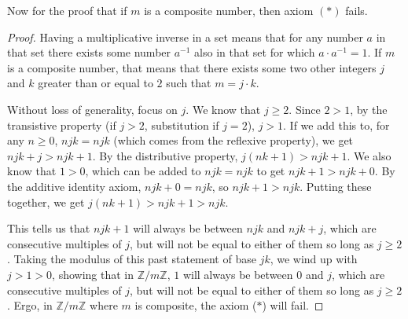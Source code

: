 \documentclass[11pt]{article}
\begin{document}
    Now for the proof that if $m$ is a composite number, then axiom $(\ast)$ fails.
    \begin{proof}
        Having a multiplicative inverse in a set means that for any number $a$ in that set there exists some number $a^{-1}$ also in that set for which $a \cdot a^{-1} = 1$.
        If $m$ is a composite number, that means that there exists some two other integers $j$ and $k$ greater than or equal to $2$ such that $m = j \cdot k$.

        Without loss of generality, focus on $j$.
        We know that $j \ge 2$.
        Since $2 > 1$, by the transistive property (if $j > 2$, substitution if $j = 2$), $j > 1$.
        If we add this to, for any $n \geq 0$, $njk = njk$ (which comes from the reflexive property), we get $njk + j > njk + 1$.
        By the distributive property, $j(nk + 1) > njk + 1$.
        We also know that $1 > 0$, which can be added to $njk = njk$ to get $njk + 1 > njk + 0$.
        By the additive identity axiom, $njk + 0 = njk$, so $njk + 1 > njk$.
        Putting these together, we get $j(nk + 1) > njk + 1 > njk$.

        This tells us that $njk + 1$ will always be between $njk$ and $njk + j$, which are consecutive multiples of $j$, but will not be equal to either of them so long as $j \geq 2$.
        Taking the modulus of this past statement of base $jk$, we wind up with $j > 1 > 0$, showing that in $\mathbb{Z}/m\mathbb{Z}$, $1$ will always be between $0$ and $j$, which are consecutive multiples of $j$, but will not be equal to either of them so long as $j \geq 2$.
        Ergo, in $\mathbb{Z}/m\mathbb{Z}$ where $m$ is composite, the axiom ($\ast$) will fail.
    \end{proof}
    
\end{document}
